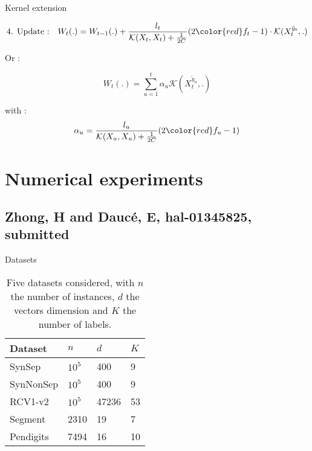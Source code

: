 \documentclass{beamer}
\begin{document}
\begin{frame}{Kernel extension}

\begin{block}{}
	\small
	\begin{align*}
		\text{4. Update :} 
		&& W_t(.) = W_{t-1}(.) + \frac{l_t}{\mathcal{K}(X_t,X_t) + \frac{1}{2C}} (2{\color{red}f_t}-1)\cdot \mathcal{K}(X_t^{\tilde{y}_t},.)
	\end{align*}
	\normalsize
\end{block}

Or :
\begin{exampleblock}{}
	$$W_t(.) = \sum_{u=1}^{t} \alpha_u  \mathcal{K}(X_t^{\tilde{y}_u},.)$$
\end{exampleblock}
with : 
$$ \alpha_{u} = \frac{l_u}{\mathcal{K}(X_u,X_u) + \frac{1}{2C}} (2{\color{red}f_u}-1)
$$


\end{frame}

\section{Numerical experiments}
\subsection{Zhong, H and Daucé, E, hal-01345825, submitted}

\begin{frame}
	\tableofcontents[currentsubsection]
\end{frame} 

\begin{frame}{Datasets}
	\begin{table}[h]
		\caption{Five datasets considered, with $n$ the number of instances, $d$ the vectors dimension and $K$ the number of labels.}
		\label{table:mce}
		\begin{center}
			\begin{tabular}{l l l l}
				{\bf Dataset}  & {\bf $n$} & {\bf $d$} & {\bf $K$}\\
				\hline
				SynSep & $10^5$ 	& 400 	& 9 \\
				
				SynNonSep & $10^5$ & 400 	& 9 \\
				
				RCV1-v2  & $10^5$ 	& 47236 	& 53 \\
				
				Segment & 2310	& 19	& 7	\\
				
				Pendigits 	& 7494	& 16	& 10	\\
			\end{tabular}
		\end{center}
	\end{table}
\end{frame}
\end{document}
